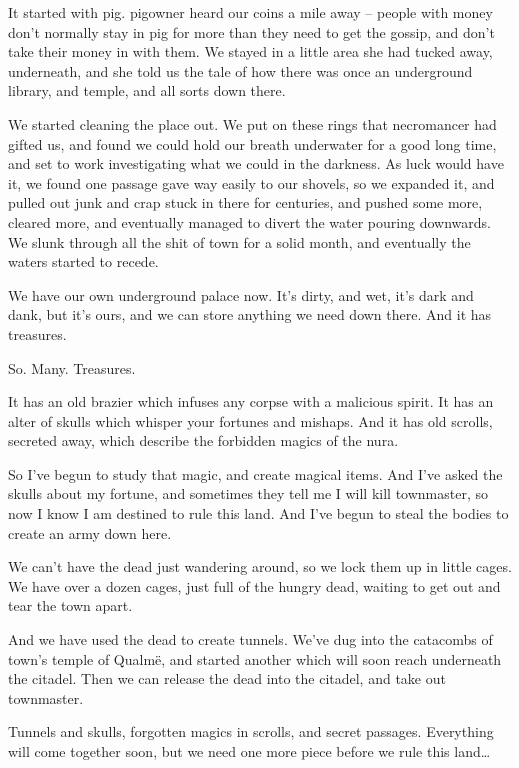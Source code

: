 \begin{multicols}{2}
\begin{exampletext}
  It started with \gls{pig}.
  \Gls{pigowner} heard our coins a mile away -- people with money don't normally stay in \gls{pig} for more than they need to get the gossip, and don't take their money in with them.
  We stayed in a little area she had tucked away, underneath, and she told us the tale of how there was once an underground library, and temple, and all sorts down there.

  We started cleaning the place out.
  We put on these rings that \gls{necromancer} had gifted us, and found we could hold our breath underwater for a good long time, and set to work investigating what we could in the darkness.
  As luck would have it, we found one passage gave way easily to our shovels, so we expanded it, and pulled out junk and crap stuck in there for centuries, and pushed some more, cleared more, and eventually managed to divert the water pouring downwards.
  We slunk through all the shit of \gls{town} for a solid month, and eventually the waters started to recede.

  We have our own underground palace now.
  It's dirty, and wet, it's dark and dank, but it's ours, and we can store anything we need down there.
  And it has treasures.

  So. Many. Treasures.

  It has an old brazier which infuses any corpse with a malicious spirit.
  It has an alter of skulls which whisper your fortunes and mishaps.
  And it has old scrolls, secreted away, which describe the forbidden magics of the nura.
  
  So I've begun to study that magic, and create magical items.
  And I've asked the skulls about my fortune, and sometimes they tell me I will kill \gls{townmaster}, so now I know I am destined to rule this land.
  And I've begun to steal the bodies to create an army down here.

  We can't have the dead just wandering around, so we lock them up in little cages.
  We have over a dozen cages, just full of the hungry dead, waiting to get out and tear the town apart.

  And we have used the dead to create tunnels.
  We've dug into the catacombs of \gls{town}'s temple of Qualm\"{e}, and started another which will soon reach underneath the citadel.
  Then we can release the dead into the citadel, and take out \gls{townmaster}.

  Tunnels and skulls, forgotten magics in scrolls, and secret passages.
  Everything will come together soon, but we need one more piece before we rule this land\ldots


\end{exampletext}
\end{multicols}
